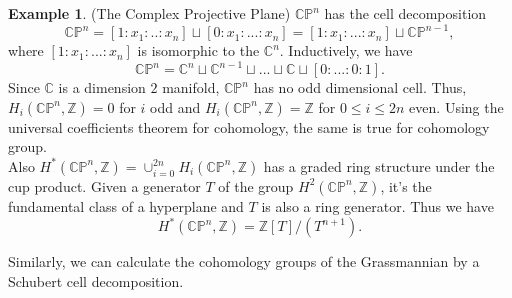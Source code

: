 \documentclass[psamsfonts]{amsart}
\theoremstyle{definition}
\newtheorem{exmp}[theorem]{Example}
\theoremstyle{remark}
\numberwithin{equation}{section}
\begin{document}
		\begin{exmp}(The Complex Projective Plane)
			$\mathbb{CP}^n$ has the cell decomposition 
			\begin{equation}
				\mathbb{CP}^n = [1:x_1:..:x_n] \sqcup [0:x_1:...:x_n] = [1:x_1:...:x_n] \sqcup \mathbb{CP}^{n-1},
			\end{equation}
			where $[1:x_1:...:x_n]$ is isomorphic to the $\mathbb{C}^n$. Inductively, we have
			\begin{equation}
				\mathbb{CP}^n = \mathbb{C}^n \sqcup \mathbb{C}^{n-1} \sqcup ... \sqcup \mathbb{C} \sqcup [0:...:0:1].
			\end{equation}
			Since $\mathbb{C}$ is a dimension $2$ manifold, $\mathbb{CP}^n$ has no odd dimensional cell. Thus, $H_i(\mathbb{CP}^n, \mathbb{Z}) = 0$ for $i$ odd and $H_i(\mathbb{CP}^n, \mathbb{Z}) = \mathbb{Z}$ for $0 \leq i \leq 2n$ even. Using the universal coefficients theorem for cohomology, the same is true for cohomology group.\\
			\indent Also $H^*(\mathbb{CP}^n, \mathbb{Z}) = \cup _{i=0}^{2n} H_i(\mathbb{CP}^n, \mathbb{Z})$ has a graded ring structure under the cup product. Given a generator $T$ of the group $H^2(\mathbb{CP}^n, \mathbb{Z})$, it's the fundamental class of a hyperplane and $T$ is also a ring generator. Thus we have
			\begin{equation}
				H^*(\mathbb{CP}^n, \mathbb{Z}) = \mathbb{Z}[T] / (T^{n+1}).
			\end{equation}
			
		\end{exmp}	
		 Similarly, we can calculate the cohomology groups of the Grassmannian by a Schubert cell decomposition.
\end{document}
